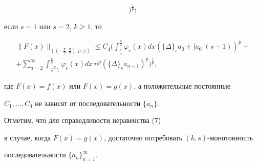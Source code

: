 \begin{assrt}
\begin{equation}
\bigg)^{\frac{1}{p}};


\end{equation}





если $s=1$ или $s=2$, $k\geq 1$, то


\begin{multline}


\| F(x)\|_{((-\frac{\pi}{2},\frac{\pi}{2});p;\varphi)}\leq


C_4\bigg(\int_{\frac{\pi}{4}}^{\frac{\pi}{2}} \varphi_c(x) dx


(\{\Delta\}_sa_0+|a_0|(s-1))^p+ \\ +


\sum\limits_{n=2}^{\infty}


\int_{\frac{\pi}{n+1}}^{\frac{\pi}{n}} \varphi_c(x) dx\, n^p


(\{\Delta\}_sa_{n-1})^p \bigg)^{\frac{1}{p}},


\end{multline}


где $F(x)=f(x)$ или $F(x)=g(x)$, а положительные постоянные


$C_1,\dotsc,C_4$ не зависят от последовательности $\{a_n\}$.


\end{assrt}





Отметим, что для справедливости неравенства (7)


в случае, когда $F(x)=g(x)$, достаточно потребовать $(k,s)$-монотонность


последовательности $\{a_n\}_{n=1}^{\infty}$.





